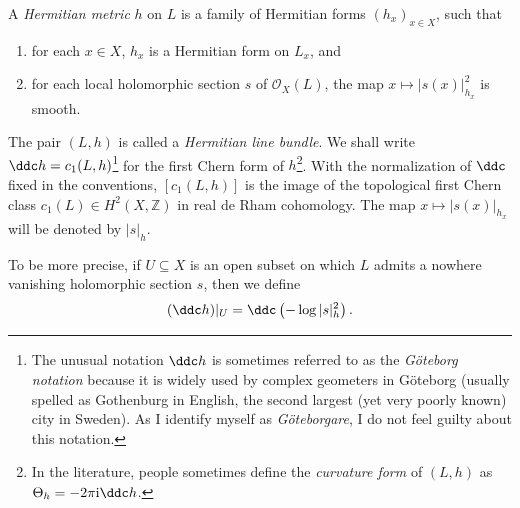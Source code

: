 \begin{definition}\label{def:Hermmetric}
    A \emph{Hermitian metric} $h$ on $L$ is a family of Hermitian forms $(h_x)_{x\in X}$, such that
    \begin{enumerate}
        \item\label{itm:def:Hermmetric:1} for each $x\in X$, $h_x$ is a Hermitian form on $L_x$, and
        \item\label{itm:def:Hermmetric:2} for each local holomorphic section $s$ of $\mathcal{O}_X(L)$, the map $x\mapsto |s(x)|^2_{h_x}$ is smooth.
    \end{enumerate}
    The pair $(L,h)$ is called a \emph{Hermitian line bundle}.
    We shall write $\ddc h=c_1(L,h)$\footnote{The unusual notation $\ddc h$ is sometimes referred to as the \emph{Göteborg notation} because it is widely used by complex geometers in Göteborg (usually spelled as Gothenburg in English, the second largest (yet very poorly known) city in Sweden). As I identify myself as \emph{Göteborgare}, I do not feel guilty about this notation.} for the first Chern form of $h$\footnote{In the literature, people sometimes define the \emph{curvature form} of $(L,h)$ as $\Theta_{h}=-2\pi\mathrm{i}\ddc h$.}. With the normalization of $\ddc$ fixed in the conventions, $[c_1(L,h)]$ is the image of the topological first Chern class $c_1(L)\in H^2(X,\mathbb{Z})$ in real de Rham cohomology.
    The map $x\mapsto |s(x)|_{h_x}$ will be denoted by $|s|_h$.

    To be more precise, if $U\subseteq X$ is an open subset on which $L$ admits a nowhere vanishing holomorphic section $s$, then we define
    \[
    (\ddc h)|_U=\ddc \left(-\log |s|_h^2\right).
    \]
\end{definition}


